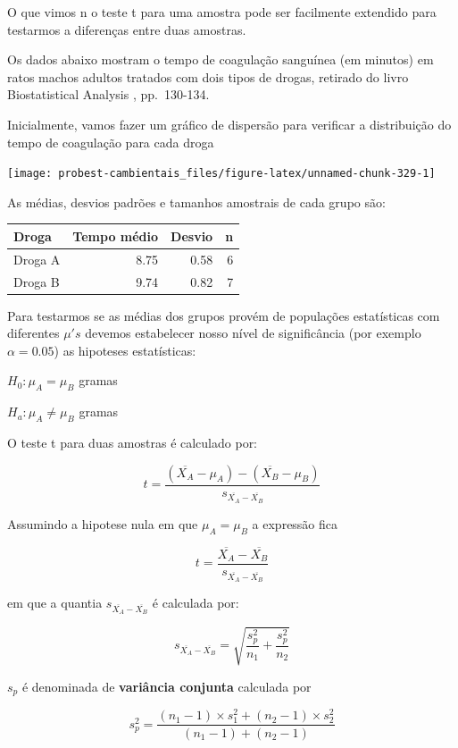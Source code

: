 \documentclass[
]{book}
\begin{document}
O que vimos n o teste t para uma amostra pode ser facilmente extendido para testarmos a diferenças entre duas amostras.

Os dados abaixo mostram o tempo de coagulação sanguínea (em minutos) em ratos machos adultos tratados com dois tipos de drogas, retirado do livro Biostatistical Analysis \citep{zar2010biostatistical}, pp.~130-134.

Inicialmente, vamos fazer um gráfico de dispersão para verificar a distribuição do tempo de coagulação para cada droga

\begin{center}\texttt{[image: probest-cambientais\_files/figure-latex/unnamed-chunk-329-1]} \end{center}

As médias, desvios padrões e tamanhos amostrais de cada grupo são:

\begin{tabular}{l|r|r|r}
\hline
Droga & Tempo médio & Desvio & n\\
\hline
Droga A & 8.75 & 0.58 & 6\\
\hline
Droga B & 9.74 & 0.82 & 7\\
\hline
\end{tabular}

Para testarmos se as médias dos grupos provém de populações estatísticas com diferentes \(\mu's\) devemos estabelecer nosso nível de significância (por exemplo \(\alpha = 0.05\)) as hipoteses estatísticas:

\(H_0: \mu_A = \mu_B\) gramas

\(H_a: \mu_A \ne \mu_B\) gramas

O teste t para duas amostras é calculado por:

\[t = \frac{(\overline{X_A} - \mu_A) - (\overline{X_B} - \mu_B)}{s_{\overline{X_A}-\overline{X_B}}}\]

Assumindo a hipotese nula em que \(\mu_A = \mu_B\) a expressão fica

\[t = \frac{\overline{X_A} - \overline{X_B}}{s_{\overline{X_A}-\overline{X_B}}}\]

em que a quantia \(s_{\overline{X_A}-\overline{X_B}}\) é calculada por:

\[s_{\overline{X_A}-\overline{X_B}} = \sqrt{\frac{s^2_{p}}{n_1} + \frac{s^2_{p}}{n_2}}\]

\(s_p\) é denominada de \textbf{variância conjunta} calculada por

\[s^2_p = \frac{(n_1 - 1) \times s^2_1 + (n_2 - 1) \times s^2_2}{(n_1 - 1) + (n_2 - 1)}\]
\end{document}
